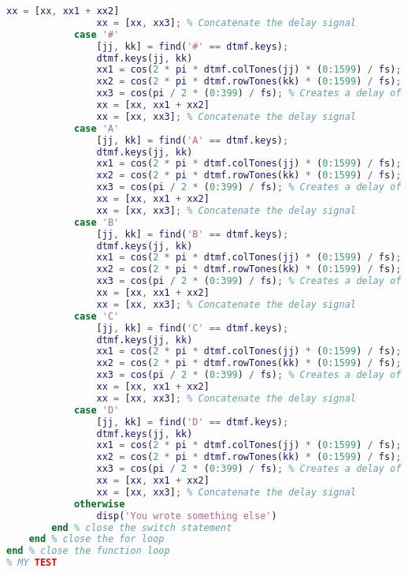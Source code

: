 \begin{lstlisting}[language=Matlab]
                xx = [xx, xx1 + xx2]
                xx = [xx, xx3]; % Concatenate the delay signal
            case '#'
                [jj, kk] = find('#' == dtmf.keys);
                dtmf.keys(jj, kk)
                xx1 = cos(2 * pi * dtmf.colTones(jj) * (0:1599) / fs);
                xx2 = cos(2 * pi * dtmf.rowTones(kk) * (0:1599) / fs);
                xx3 = cos(pi / 2 * (0:399) / fs); % Creates a delay of 0.05 secs
                xx = [xx, xx1 + xx2]
                xx = [xx, xx3]; % Concatenate the delay signal
            case 'A'
                [jj, kk] = find('A' == dtmf.keys);
                dtmf.keys(jj, kk)
                xx1 = cos(2 * pi * dtmf.colTones(jj) * (0:1599) / fs);
                xx2 = cos(2 * pi * dtmf.rowTones(kk) * (0:1599) / fs);
                xx3 = cos(pi / 2 * (0:399) / fs); % Creates a delay of 0.05 secs
                xx = [xx, xx1 + xx2]
                xx = [xx, xx3]; % Concatenate the delay signal
            case 'B'
                [jj, kk] = find('B' == dtmf.keys);
                dtmf.keys(jj, kk)
                xx1 = cos(2 * pi * dtmf.colTones(jj) * (0:1599) / fs);
                xx2 = cos(2 * pi * dtmf.rowTones(kk) * (0:1599) / fs);
                xx3 = cos(pi / 2 * (0:399) / fs); % Creates a delay of 0.05 secs
                xx = [xx, xx1 + xx2]
                xx = [xx, xx3]; % Concatenate the delay signal
            case 'C'
                [jj, kk] = find('C' == dtmf.keys);
                dtmf.keys(jj, kk)
                xx1 = cos(2 * pi * dtmf.colTones(jj) * (0:1599) / fs);
                xx2 = cos(2 * pi * dtmf.rowTones(kk) * (0:1599) / fs);
                xx3 = cos(pi / 2 * (0:399) / fs); % Creates a delay of 0.05 secs
                xx = [xx, xx1 + xx2]
                xx = [xx, xx3]; % Concatenate the delay signal
            case 'D'
                [jj, kk] = find('D' == dtmf.keys);
                dtmf.keys(jj, kk)
                xx1 = cos(2 * pi * dtmf.colTones(jj) * (0:1599) / fs);
                xx2 = cos(2 * pi * dtmf.rowTones(kk) * (0:1599) / fs);
                xx3 = cos(pi / 2 * (0:399) / fs); % Creates a delay of 0.05 secs
                xx = [xx, xx1 + xx2]
                xx = [xx, xx3]; % Concatenate the delay signal
            otherwise
                disp('You wrote something else')
        end % close the switch statement
    end % close the for loop
end % close the function loop
% MY TEST
\end{lstlisting}
